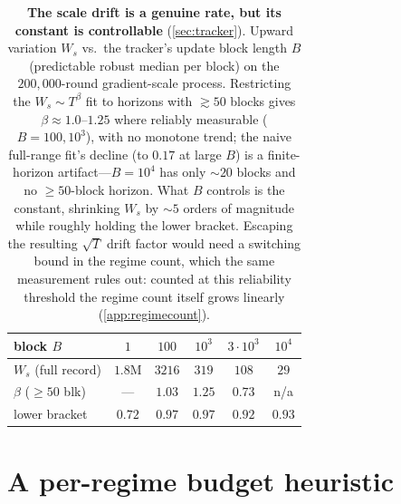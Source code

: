 \documentclass{article}
\begin{document}
\begin{table}[t]
\caption{\textbf{The scale drift is a genuine rate, but its constant is controllable}
(\cref{sec:tracker}). Upward variation $W_s$ vs.\ the tracker's update block length $B$ (predictable robust
median per block) on the $200{,}000$-round gradient-scale process. Restricting the
$W_s\sim T^{\beta}$ fit to horizons with $\gtrsim\!50$ blocks gives $\beta\approx1.0$--$1.25$
where reliably measurable ($B{=}100,10^3$), with no monotone trend; the naive full-range
fit's decline (to $0.17$ at large $B$) is a finite-horizon artifact---$B{=}10^4$ has only
$\sim\!20$ blocks and no $\ge\!50$-block horizon. What $B$ controls is the constant,
shrinking $W_s$ by $\sim\!5$ orders of magnitude while roughly holding the lower bracket.
Escaping the resulting $\sqrt T$ drift factor would need a switching bound in the regime
count, which the same measurement rules out: counted at this reliability threshold the regime
count itself grows linearly (\cref{app:regimecount}).}
\label{tab:beta}
\centering
\begin{small}
\begin{tabular}{lccccc}
\toprule
block $B$              & $1$ & $100$ & $10^3$ & $3{\cdot}10^3$ & $10^4$ \\
\midrule
$W_s$ (full record)   & $1.8\mathrm{M}$ & $3216$ & $319$ & $108$ & $29$ \\
$\beta$ ($\ge\!50$ blk) & --- & $1.03$ & $1.25$ & $0.73$ & n/a \\
lower bracket         & $0.72$ & $0.97$ & $0.97$ & $0.92$ & $0.93$ \\
\bottomrule
\end{tabular}
\end{small}
\end{table}

\section{A per-regime budget heuristic}
\label{sec:lower}
\end{document}
